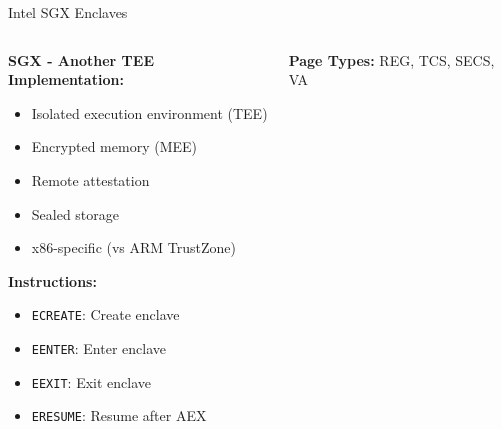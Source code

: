 \documentclass[aspectratio=169,12pt]{beamer}
\begin{document}
\begin{frame}{Intel SGX Enclaves}
    \begin{columns}
        \begin{column}{0.5\textwidth}
            \textbf{SGX - Another TEE Implementation:}
            \begin{itemize}
                \item Isolated execution environment (TEE)
                \item Encrypted memory (MEE)
                \item Remote attestation
                \item Sealed storage
                \item x86-specific (vs ARM TrustZone)
            \end{itemize}
            
            \vspace{0.3cm}
            \textbf{Instructions:}
            \begin{itemize}
                \item \texttt{ECREATE}: Create enclave
                \item \texttt{EENTER}: Enter enclave
                \item \texttt{EEXIT}: Exit enclave
                \item \texttt{ERESUME}: Resume after AEX
            \end{itemize}
        \end{column}
        \begin{column}{0.5\textwidth}
            
            \vspace{0.3cm}
            \textbf{Page Types:}
            REG, TCS, SECS, VA
        \end{column}
    \end{columns}
\end{frame}
\end{document}

